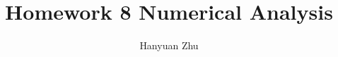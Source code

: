 \documentclass{article}
\title{Homework 8 Numerical Analysis}
\author{Hanyuan Zhu}
\date{}
\begin{document}
\begin{equation}
  \begin{split}
    
  \end{split}
\end{equation}
\end{document}
